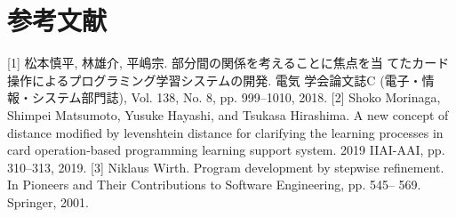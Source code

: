 \section{参考文献}

[1] 松本慎平, 林雄介, 平嶋宗. 部分間の関係を考えることに焦点を当
てたカード操作によるプログラミング学習システムの開発. 電気
学会論文誌C (電子・情報・システム部門誌), Vol. 138, No. 8, pp.
999–1010, 2018.
[2] Shoko Morinaga, Shimpei Matsumoto, Yusuke Hayashi, and Tsukasa
Hirashima. A new concept of distance modified by levenshtein distance
for clarifying the learning processes in card operation-based
programming learning support system. 2019 IIAI-AAI, pp. 310–313,
2019.
[3] Niklaus Wirth. Program development by stepwise refinement. In
Pioneers and Their Contributions to Software Engineering, pp. 545–
569. Springer, 2001.
